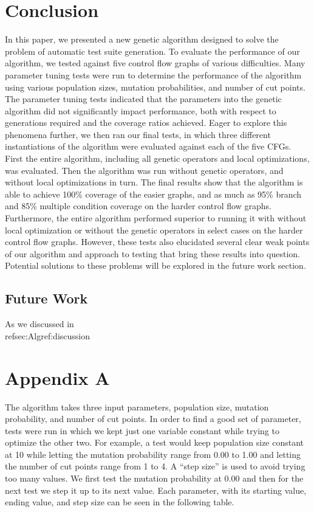 \documentclass[runningheads]{llncs}
\begin{document}
\section{Conclusion}

In this paper, we presented a new genetic algorithm designed to solve the problem of automatic test suite generation. To evaluate the performance of our algorithm, we tested against five control flow graphs of various difficulties. Many parameter tuning tests were run to determine the performance of the algorithm using various population sizes, mutation probabilities, and number of cut points. The parameter tuning tests indicated that the parameters into the genetic algorithm did not significantly impact performance, both with respect to generations required and the coverage ratios achieved. Eager to explore this phenomena further, we then ran our final tests, in which three different instantiations of the algorithm were evaluated against each of the five CFGs. First the entire algorithm, including all genetic operators and local optimizations, was evaluated. Then the algorithm was run without genetic operators, and without local optimizations in turn. The final results show that the algorithm is able to achieve 100\% coverage of the easier graphs, and as much as 95\% branch and 85\% multiple condition coverage on the harder control flow graphs. Furthermore, the entire algorithm performed superior to running it with without local optimization or without the genetic operators in select cases on the harder control flow graphs. However, these tests also elucidated several clear weak points of our algorithm and approach to testing that bring these results into question. Potential solutions to these problems will be explored in the future work section.

\subsection{Future Work}

As we discussed in \\ref{sec:Alg}{ref:discussion} 


\section*{Appendix A}

The algorithm takes three input parameters, population size, mutation probability, and number of cut points. In order to find a good set of parameter, tests were run in which we kept just one variable constant while trying to optimize the other two. For example, a test would keep population size constant at 10 while letting the mutation probability range from 0.00 to 1.00 and letting the number of cut points range from 1 to 4. A ``step size'' is used to avoid trying too many values. We first test the mutation probability at 0.00 and then for the next test we step it up to its next value. Each parameter, with its starting value, ending value, and step size can be seen in the following table.
\end{document}
